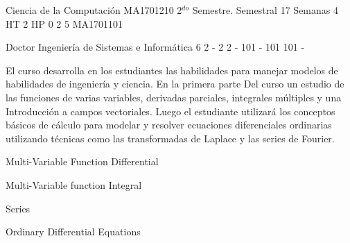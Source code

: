 \documentclass[a4paper,8pt]{article}
\begin{document}
\setNombreProfesor{}
\setGradoProfesorAbreviado{}
\sylabusHeader

\academicaTable
{Ciencia de la Computación} %
{MA1701210} %
{2$^{do}$ Semestre.} %
{Semestral} %
{17 Semanas} %
{4 HT} %
{2 HP} %
{0} %
{}  %
{2} %
{5} %
{MA1701101} %

\administrativaTable
{Doctor} %
{Ingeniería de Sistemas e Informática} %
{6} %
{2} %
{-} %
{2} %
{2} %
{-} %
{101} %
{-} %
{101} %
{101} %
{-} %


\begin{fundamentacion}
El curso desarrolla en los estudiantes las habilidades para manejar modelos de habilidades de ingeniería y ciencia. En la primera parte
Del curso un estudio de las funciones de varias variables, derivadas parciales, integrales múltiples y una
Introducción a campos vectoriales. Luego el estudiante utilizará los conceptos básicos de cálculo para modelar y resolver ecuaciones diferenciales ordinarias utilizando técnicas como las transformadas de Laplace y las series de Fourier.


\end{fundamentacion}

\begin{sumilla}
\item Multi-Variable Function Differential
\item Multi-Variable function Integral
\item Series
\item Ordinary Differential Equations

\end{sumilla}

\begin{competenciasAsignatura}
\item {}
\item {}

\end{competenciasAsignatura}
\end{document}
